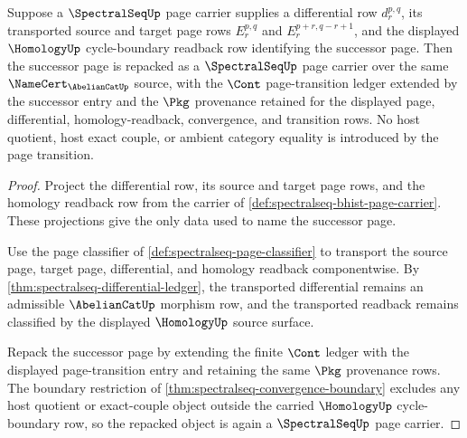 \begin{theorem}
\label{thm:spectralseq-successor-page-closure}
Suppose a $\SpectralSeqUp$ page carrier supplies a differential row
$d_r^{p,q}$, its transported source and target page rows
$E_r^{p,q}$ and $E_r^{p+r,q-r+1}$, and the displayed $\HomologyUp$
cycle-boundary readback row identifying the successor page. Then the successor
page is repacked as a $\SpectralSeqUp$ page carrier over the same
$\NameCert_{\AbelianCatUp}$ source, with the $\Cont$ page-transition ledger
extended by the successor entry and the $\Pkg$ provenance retained for the
displayed page, differential, homology-readback, convergence, and transition
rows. No host quotient, host exact couple, or ambient category equality is
introduced by the page transition.
\end{theorem}
\begin{proof}
Project the differential row, its source and target page rows, and the
homology readback row from the carrier of
\autoref{def:spectralseq-bhist-page-carrier}. These projections give the
only data used to name the successor page.

Use the page classifier of \autoref{def:spectralseq-page-classifier} to
transport the source page, target page, differential, and homology readback
componentwise. By \autoref{thm:spectralseq-differential-ledger}, the
transported differential remains an admissible $\AbelianCatUp$ morphism row,
and the transported readback remains classified by the displayed
$\HomologyUp$ source surface.

Repack the successor page by extending the finite $\Cont$ ledger with the
displayed page-transition entry and retaining the same $\Pkg$ provenance rows.
The boundary restriction of \autoref{thm:spectralseq-convergence-boundary}
excludes any host quotient or exact-couple object outside the carried
$\HomologyUp$ cycle-boundary row, so the repacked object is again a
$\SpectralSeqUp$ page carrier.
\end{proof}

